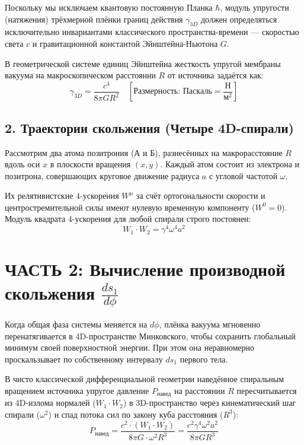 \documentclass[12pt,a4paper]{article}
\begin{document}
Поскольку мы исключаем квантовую постоянную Планка $\hbar$, модуль упругости (натяжения) трёхмерной плёнки границ действия $\gamma_{3D}$ должен определяться исключительно инвариантами классического пространства-времени — скоростью света $c$ и гравитационной константой Эйнштейна-Ньютона $G$.

В геометрической системе единиц Эйнштейна жесткость упругой мембраны вакуума на макроскопическом расстоянии $R$ от источника задаётся как:
\begin{equation}
\gamma_{3D} = \frac{c^4}{8\pi G R^2} \quad \left[\text{Размерность: Паскаль} = \frac{\text{Н}}{\text{м}^2}\right]
\end{equation}

\subsection*{2. Траектории скольжения (Четыре 4D-спирали)}

Рассмотрим два атома позитрония (А и Б), разнесённых на макрорасстояние $R$ вдоль оси $x$ в плоскости вращения $(x, y)$. Каждый атом состоит из электрона и позитрона, совершающих круговое движение радиуса $a$ с угловой частотой $\omega$.

Их релятивистские 4-ускорения $W^\mu$ за счёт ортогональности скорости и центростремительной силы имеют нулевую временную компоненту ($W^0 = 0$). Модуль квадрата 4-ускорения для любой спирали строго постоянен:
\begin{equation}
W_1 \cdot W_2 = \gamma^4 \omega^4 a^2
\end{equation}

\section*{ЧАСТЬ 2: Вычисление производной скольжения $\frac{ds_1}{d\phi}$}

Когда общая фаза системы меняется на $d\phi$, плёнка вакуума мгновенно перенатягивается в 4D-пространстве Минковского, чтобы сохранить глобальный минимум своей поверхностной энергии. При этом она неравномерно проскальзывает по собственному интервалу $ds_1$ первого тела.

В чисто классической дифференциальной геометрии наведённое спиральным вращением источника упругое давление $P_{навед}$ на расстоянии $R$ пересчитывается из 4D-излома нормалей ($W_1 \cdot W_2$) в 3D-пространство через кинематический шаг спирали ($\omega^2$) и спад потока сил по закону куба расстояния ($R^3$):
\begin{equation}
P_{навед} = \frac{c^2 \cdot (W_1 \cdot W_2)}{8\pi G \cdot \omega^2 R^3} = \frac{c^2 \gamma^4 \omega^2 a^2}{8\pi G R^3}
\end{equation}
\end{document}
